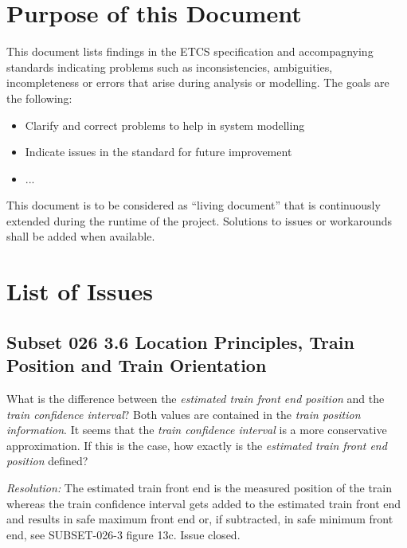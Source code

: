 \documentclass{template/openetcs_article}
\begin{document}
\newcommand{\resolution}{\textit{Resolution: }}	

\maketitle

\tableofcontents
\newpage



\section{Purpose of this Document}

  This document lists findings in the ETCS specification and accompagnying standards indicating problems such as inconsistencies, ambiguities, incompleteness or errors that arise during analysis or modelling. The goals are the following:
  \begin{itemize}
    \item Clarify and correct problems to help in system modelling
    \item Indicate issues in the standard for future improvement
    \item ... 
  \end{itemize}

This document is to be considered as ``living document'' that is continuously extended during the runtime of the project. Solutions to issues or workarounds shall be added when available.



\section{List of Issues}

\subsection{Subset 026 3.6 Location Principles, Train Position and Train Orientation}

What is the difference between the \emph{estimated train front end position} and the \emph{train confidence interval}? Both values are contained in the \emph{train position information}. It seems that the \emph{train confidence interval} is a more conservative approximation. If this is the case, how exactly is the \emph{estimated train front end position} defined?

\resolution The estimated train front end is the measured position of the train whereas the train confidence interval gets added to the estimated train front end and results in safe maximum front end or, if subtracted, in safe minimum front end, see SUBSET-026-3 figure 13c. Issue closed.
\end{document}
